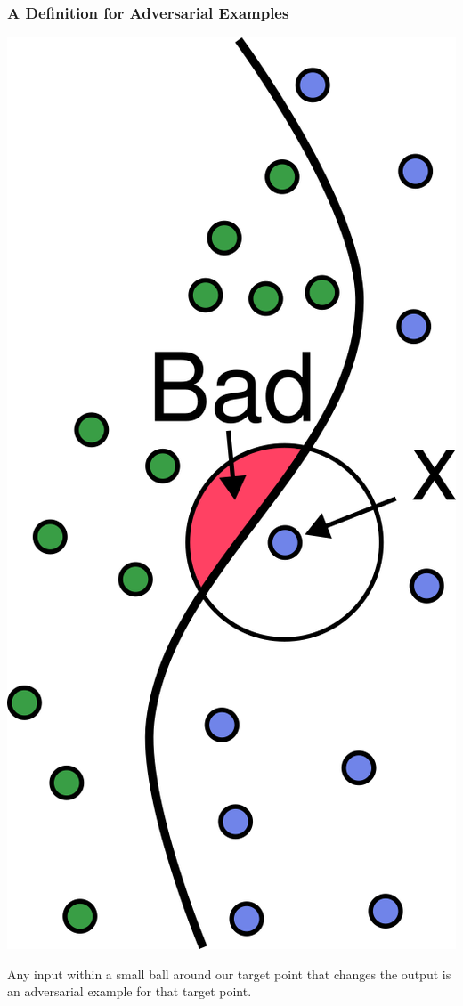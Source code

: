 \documentclass{beamer}
\begin{document}
\begin{frame}
    \frametitle{A Definition for Adversarial Examples}
    \begin{center}
    \includegraphics[scale=1.1]{current_definition.png}
    \end{center}
    Any input within a small ball around our target point that changes the output is an adversarial example for that target point.
\end{frame}
\end{document}

